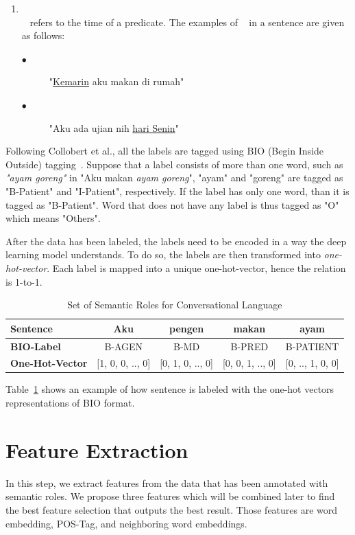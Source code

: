 \begin{enumerate}
	\item \timesrl\\
	\timesrl~ refers to the time of a predicate. The examples of \timesrl~ in a sentence are given as follows:
	\begin{description}
		\item[$\bullet$] "\underline{Kemarin} aku makan di rumah"
		\item[$\bullet$] "Aku ada ujian nih \underline{hari Senin}"
	\end{description}
\end{enumerate}

Following Collobert et al., all the labels are tagged using BIO (Begin Inside Outside) tagging~\cite{collobert2011natural}. Suppose that a label \patient consists of more than one word, such as \textit{"ayam goreng"} in "Aku makan \textit{ayam goreng}", "ayam" and "goreng" are tagged as "B-Patient" and "I-Patient", respectively. If the label has only one word, than it is tagged as "B-Patient". Word that does not have any label is thus tagged as "O" which means "Others".

After the data has been labeled, the labels need to be encoded in a way the deep learning model understands. To do so, the labels are then transformed into \textit{one-hot-vector}. Each label is mapped into a unique one-hot-vector, hence the relation is 1-to-1.
\begin{table}
	\centering
	\caption{Set of Semantic Roles for Conversational Language}
	\label{tab:examplelabel}
	\begin{tabular}{|lcccc|}
		\hline
		\textbf{Sentence} 				& Aku & pengen & makan & ayam \\
		\hline
		\textbf{BIO-Label}				& B-AGEN & B-MD & B-PRED & B-PATIENT  \\
		\hline
		\textbf{One-Hot-Vector}		& [1, 0, 0, .., 0] & [0, 1, 0, .., 0] & [0, 0, 1, .., 0] & [0, .., 1, 0, 0] \\
		\hline
	\end{tabular}
\end{table}

Table~\ref{tab:examplelabel} shows an example of how sentence is labeled with the one-hot vectors representations of BIO format.



\section{Feature Extraction}
In this step, we extract features from the data that has been annotated with semantic roles. We propose three features which will be combined later to find the best feature selection that outputs the best result. Those features are word embedding, POS-Tag, and neighboring word embeddings.

